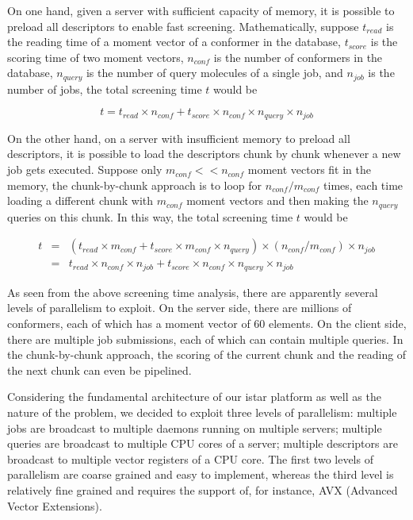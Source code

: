 \documentclass[a4,center,fleqn]{NAR}
\begin{document}
On one hand, given a server with sufficient capacity of memory, it is possible to preload all descriptors to enable fast screening. Mathematically, suppose $t_{read}$ is the reading time of a moment vector of a conformer in the database, $t_{score}$ is the scoring time of two moment vectors, $n_{conf}$ is the number of conformers in the database, $n_{query}$ is the number of query molecules of a single job, and $n_{job}$ is the number of jobs, the total screening time $t$ would be

\begin{equation}
t=t_{read}\times n_{conf}+t_{score}\times n_{conf}\times n_{query}\times n_{job}
\label{time0}
\end{equation}

On the other hand, on a server with insufficient memory to preload all descriptors, it is possible to load the descriptors chunk by chunk whenever a new job gets executed. Suppose only $m_{conf} << n_{conf}$ moment vectors fit in the memory, the chunk-by-chunk approach is to loop for $n_{conf}/m_{conf}$ times, each time loading a different chunk with $m_{conf}$ moment vectors and then making the $n_{query}$ queries on this chunk. In this way, the total screening time $t$ would be

\begin{eqnarray}
t&=&(t_{read}\times m_{conf}+t_{score}\times m_{conf}\times n_{query})\times(n_{conf}/m_{conf})\times n_{job}\nonumber\\
 &=&t_{read}\times n_{conf}\times n_{job}+t_{score}\times n_{conf}\times n_{query}\times n_{job}
\label{time1}
\end{eqnarray}

As seen from the above screening time analysis, there are apparently several levels of parallelism to exploit. On the server side, there are millions of conformers, each of which has a moment vector of 60 elements. On the client side, there are multiple job submissions, each of which can contain multiple queries. In the chunk-by-chunk approach, the scoring of the current chunk and the reading of the next chunk can even be pipelined.

Considering the fundamental architecture of our istar platform \cite{1362} as well as the nature of the problem, we decided to exploit three levels of parallelism: multiple jobs are broadcast to multiple daemons running on multiple servers; multiple queries are broadcast to multiple CPU cores of a server; multiple descriptors are broadcast to multiple vector registers of a CPU core. The first two levels of parallelism are coarse grained and easy to implement, whereas the third level is relatively fine grained and requires the support of, for instance, AVX (Advanced Vector Extensions).
\end{document}
